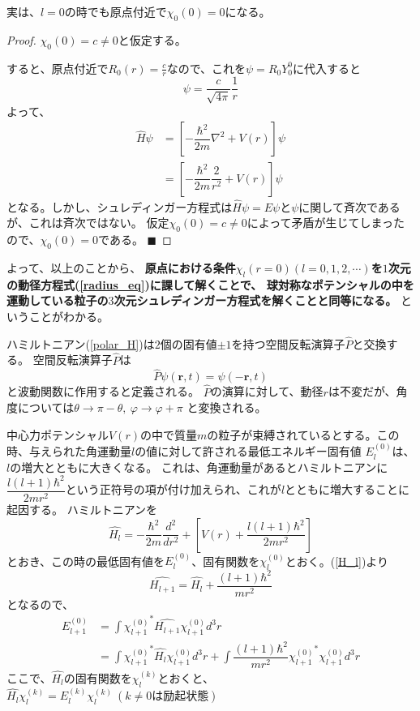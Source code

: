 \documentclass[dvipdfmx,a4paper,16pt]{jsarticle}
\newtheorem{proof}{証明}
\newcommand{\qed}{\qquad $\blacksquare$}
\begin{document}
実は、$l=0$の時でも原点付近で$\chi_0(0) = 0$になる。
\begin{proof}
	$\chi_0(0) = c \neq 0$と仮定する。

	すると、原点付近で$R_0(r) = \frac{c}{r}$なので、これを$\psi = R_0Y_0^0$に代入すると
	\begin{equation}
		\psi = \dfrac{c}{\sqrt{4\pi}}\dfrac{1}{r}
	\end{equation}
	よって、
	\begin{align}
		\hat{H}\psi &= \left[-\dfrac{\hbar^2}{2m}\nabla^2 + V(r)\right]\psi \\
		&= \left[ -\dfrac{\hbar^2}{2m}\dfrac{2}{r^2} + V(r)\right]\psi
	\end{align}
	となる。しかし、シュレディンガー方程式は$\hat{H}\psi = E\psi$と$\psi$に関して斉次であるが、これは斉次ではない。
	仮定$\chi_0(0) = c \neq 0$によって矛盾が生じてしまったので、$\chi_0(0) = 0$である。
	\qed
\end{proof}

よって、以上のことから、
{\bf 原点における条件$\chi_l(r = 0)(l = 0,1,2,\cdots)$を$1$次元の動径方程式(\ref{radius_eq})に課して解くことで、
球対称なポテンシャルの中を運動している粒子の$3$次元シュレディンガー方程式を解くことと同等になる。}
ということがわかる。

ハミルトニアン(\ref{polar_H})は$2$個の固有値$\pm1$を持つ空間反転演算子$\hat{P}$と交換する。
空間反転演算子$\hat{P}$は
\begin{equation}
	\hat{P}\psi(\bm{r},t) = \psi(-\bm{r},t)
\end{equation}
と波動関数に作用すると定義される。
$\hat{P}$の演算に対して、動径$r$は不変だが、角度については$\theta \to \pi - \theta,~\varphi \to \varphi + \pi$
と変換される。

中心力ポテンシャル$V(r)$の中で質量$m$の粒子が束縛されているとする。この時、与えられた角運動量$l$の値に対して許される最低エネルギー固有値
$E_l^{(0)}$は、$l$の増大とともに大きくなる。
これは、角運動量があるとハミルトニアンに$\dfrac{l(l+1)\hbar^2}{2mr^2}$という正符号の項が付け加えられ、これが$l$とともに増大することに起因する。
ハミルトニアンを
\begin{equation}
	\label{H_l}
	\hat{H_l} = -\dfrac{\hbar^2}{2m}\dfrac{d^2}{dr^2} + \left[ V(r) + \dfrac{l(l+1)\hbar^2}{2mr^2} \right]
\end{equation}
とおき、この時の最低固有値を$E_l^{(0)}$、固有関数を$\chi_l^{(0)}$とおく。(\ref{H_l})より
\begin{equation}
	\hat{H_{l+1}} = \hat{H_l} + \dfrac{(l+1)\hbar^2}{mr^2}
\end{equation}
となるので、
\begin{align}
	E_{l+1}^{(0)}
	&= \int {\chi_{l+1}^{(0)}}^* \hat{H_{l+1}} \chi_{l+1}^{(0)} d^3r \\
	\label{chiHchi}
	&= \int {\chi_{l+1}^{(0)}}^* \hat{H_l} \chi_{l+1}^{(0)} d^3r + \int \dfrac{(l+1)\hbar^2}{mr^2} {\chi_{l+1}^{(0)}}^* \chi_{l+1}^{(0)} d^3r
\end{align}
ここで、$\hat{H_l}$の固有関数を$\chi_l^{(k)}$とおくと、$\hat{H_l}\chi_l^{(k)} = E_l^{(k)}\chi_l^{(k)}~(k\neq 0は励起状態)$
\end{document}

